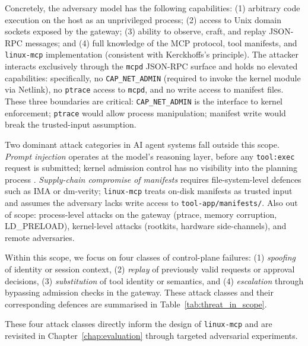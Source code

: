 Concretely, the adversary model has the following capabilities: (1) arbitrary code execution on the host as an unprivileged process; (2) access to Unix domain sockets exposed by the gateway; (3) ability to observe, craft, and replay JSON-RPC messages; and (4) full knowledge of the MCP protocol, tool manifests, and \texttt{linux-mcp} implementation (consistent with Kerckhoffs's principle).
The attacker interacts exclusively through the \texttt{mcpd} JSON-RPC surface and holds no elevated capabilities: specifically, no \texttt{CAP\_NET\_ADMIN} (required to invoke the kernel module via Netlink), no \texttt{ptrace} access to \texttt{mcpd}, and no write access to manifest files.
These three boundaries are critical: \texttt{CAP\_NET\_ADMIN} is the interface to kernel enforcement; \texttt{ptrace} would allow process manipulation; manifest write would break the trusted-input assumption.

Two dominant attack categories in AI agent systems fall outside this scope.
\emph{Prompt injection} operates at the model's reasoning layer, before any \texttt{tool:exec} request is submitted; kernel admission control has no visibility into the planning process \cite{greshake2023prompt, liu2023prompt}.
\emph{Supply-chain compromise of manifests} requires file-system-level defences such as IMA or dm-verity; \texttt{linux-mcp} treats on-disk manifests as trusted input and assumes the adversary lacks write access to \texttt{tool-app/manifests/}.
Also out of scope: process-level attacks on the gateway (ptrace, memory corruption, LD\_PRELOAD), kernel-level attacks (rootkits, hardware side-channels), and remote adversaries.

Within this scope, we focus on four classes of control-plane failures:
(1) \emph{spoofing} of identity or session context,
(2) \emph{replay} of previously valid requests or approval decisions,
(3) \emph{substitution} of tool identity or semantics, and
(4) \emph{escalation} through bypassing admission checks in the gateway.
These attack classes and their corresponding defences are summarised in Table~\ref{tab:threat_in_scope}.

These four attack classes directly inform the design of \texttt{linux-mcp} and are revisited in Chapter~\ref{chap:evaluation} through targeted adversarial experiments.

